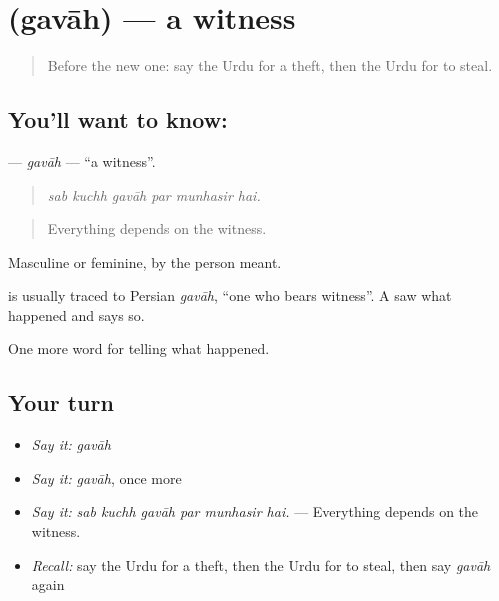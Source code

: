 \section[\texorpdfstring{\ur{گواہ} (gavāh)}{گواہ (gavāh)}]{ (gavāh) — a witness}

\label{lesson:UR-C276-gavah}



\begin{quote}
Before the new one: say the Urdu for a theft, then the Urdu for to steal.
\end{quote}

\subsection*{You'll want to know: }
\textbf{} — \emph{gavāh} — \textquotedblleft{}a witness\textquotedblright{}.

\begin{quote}
     
\end{quote}

\begin{quote}
\emph{sab kuchh gavāh par munhasir hai.}
\end{quote}

\begin{quote}
Everything depends on the witness.
\end{quote}

Masculine or feminine, by the person meant.

\begin{cousinweb}
is usually traced to Persian \emph{gavāh}, \textquotedblleft{}one who bears witness\textquotedblright{}. A \textbf{} saw what happened and says so.
\end{cousinweb}

\begin{grammarlens}[title={What you've built}]
One more word for telling what happened.
\end{grammarlens}

\subsection*{Your turn}
\begin{itemize}
\raggedright
  \item \emph{Say it:} \emph{gavāh}
  \item \emph{Say it:} \emph{gavāh}, once more
  \item \emph{Say it:} \emph{sab kuchh gavāh par munhasir hai.} — Everything depends on the witness.
  \item \emph{Recall:} say the Urdu for a theft, then the Urdu for to steal, then say \emph{gavāh} again
\end{itemize}

